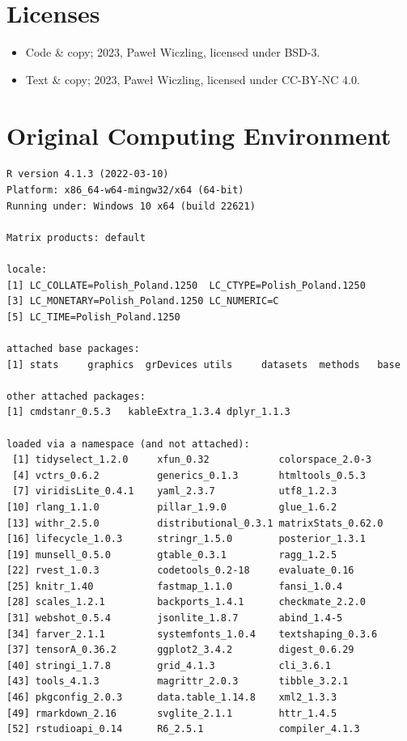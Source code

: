 \documentclass[
]{article}
\providecommand{\tightlist}{%
  \setlength{\itemsep}{0pt}\setlength{\parskip}{0pt}}\usepackage{longtable,booktabs,array}
\begin{document}
\newpage{}

\hypertarget{licenses}{%
\section*{Licenses}\label{licenses}}

\begin{itemize}
\tightlist
\item
  Code \& copy; 2023, Paweł Wiczling, licensed under BSD-3.
\item
  Text \& copy; 2023, Paweł Wiczling, licensed under CC-BY-NC 4.0.
\end{itemize}

\hypertarget{original-computing-environment}{%
\section*{Original Computing
Environment}\label{original-computing-environment}}

\begin{verbatim}
R version 4.1.3 (2022-03-10)
Platform: x86_64-w64-mingw32/x64 (64-bit)
Running under: Windows 10 x64 (build 22621)

Matrix products: default

locale:
[1] LC_COLLATE=Polish_Poland.1250  LC_CTYPE=Polish_Poland.1250   
[3] LC_MONETARY=Polish_Poland.1250 LC_NUMERIC=C                  
[5] LC_TIME=Polish_Poland.1250    

attached base packages:
[1] stats     graphics  grDevices utils     datasets  methods   base     

other attached packages:
[1] cmdstanr_0.5.3   kableExtra_1.3.4 dplyr_1.1.3     

loaded via a namespace (and not attached):
 [1] tidyselect_1.2.0     xfun_0.32            colorspace_2.0-3    
 [4] vctrs_0.6.2          generics_0.1.3       htmltools_0.5.3     
 [7] viridisLite_0.4.1    yaml_2.3.7           utf8_1.2.3          
[10] rlang_1.1.0          pillar_1.9.0         glue_1.6.2          
[13] withr_2.5.0          distributional_0.3.1 matrixStats_0.62.0  
[16] lifecycle_1.0.3      stringr_1.5.0        posterior_1.3.1     
[19] munsell_0.5.0        gtable_0.3.1         ragg_1.2.5          
[22] rvest_1.0.3          codetools_0.2-18     evaluate_0.16       
[25] knitr_1.40           fastmap_1.1.0        fansi_1.0.4         
[28] scales_1.2.1         backports_1.4.1      checkmate_2.2.0     
[31] webshot_0.5.4        jsonlite_1.8.7       abind_1.4-5         
[34] farver_2.1.1         systemfonts_1.0.4    textshaping_0.3.6   
[37] tensorA_0.36.2       ggplot2_3.4.2        digest_0.6.29       
[40] stringi_1.7.8        grid_4.1.3           cli_3.6.1           
[43] tools_4.1.3          magrittr_2.0.3       tibble_3.2.1        
[46] pkgconfig_2.0.3      data.table_1.14.8    xml2_1.3.3          
[49] rmarkdown_2.16       svglite_2.1.1        httr_1.4.5          
[52] rstudioapi_0.14      R6_2.5.1             compiler_4.1.3      
\end{verbatim}
\end{document}
